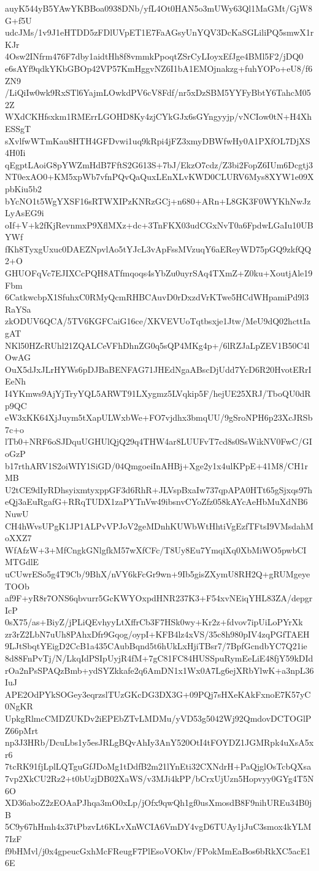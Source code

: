 auyK544yB5YAwYKBBoa0938DNb/yfL4Ot0HAN5o3mUWy63Ql1MaGMt/GjW8G+f5U
udcJMs/1v9J1eHTDD5zFDlUVpET1E7FaAGsyUnYQV3DcKaSGLiliPQ5smwX1rKJr
4Osw2INfrm476F7dby1aidtHh8f8vmmkPpoqtZSrCyLIoyxEfJge4BMl5F2/jDQ0
e6sAYf9qdkYKbGBOp42VP57KmHggvNZ6I1bA1EMOjnakzg+fuhYOPo+eU8/f6ZN9
/LiQiIw0wk9RxSTl6YajmLOwkdPV6cV8Fdf/nr5xDzSBM5YYFyBbtY6TahcM052Z
WXdCKHfsxkm1RMErrLGOHD8Ky4zjCYkGJx6sGYngyyjp/vNCIow0tN+H4XhESSgT
sXvlfwWTmKau8HTH4GFDvwi1uq9kRpi4jFZ3xmyDBWfwHy0A1PXfOL7DjXS4H0Ii
qEgptLAoiG8pYWZmHdB7FftS2G613S+7bJ/EkzO7cdz/Z3bi2FopZ6IUm6Dcgtj3
NT0exAO0+KM5xpWb7vfnPQvQaQuxLEnXLvKWD0CLURV6Mys8XYW1e09XpbKiu5b2
bYcNO1t5WgYXSF16sRTWXIPzKNRzGCj+n680+ARn+L8GK3F0WYKhNwJzLyAsEG9i
oIf+V+k2fKjRevnmxP9XflMXz+dc+3TnFKX03udCGxNvT0a6FpdwLGaIu10UBYWf
fKh8TyxgUxuc0DAEZNpvlAo5tYJcL3vApFssMVzuqY6aEReyWD75pGQ9zkfQQ2+O
GHUOFqVc7EJIXCcPQH8ATfmqoqs4sYbZu0uyrSAq4TXmZ+Z0ku+XoutjAle19Fbm
6CatkwcbpX1SfuhxC0RMyQcmRHBCAuvD0rDxzdVrKTwe5HCdWHpamiPd9l3RaYSa
zkODUV6QCA/5TV6KGFCaiG16ce/XKVEVUoTqtbsxje1Jtw/MeU9dQ02hcttIagAT
NKl50HZcRUhl21ZQALCeVFhDhnZG0q5sQP4MKg4p+/6lRZJaLpZEV1B50C4lOwAG
OuX5dJxJLrHYWs6pDJBaBENFAG71JHEdNgaABscDjUdd7YcD6R20HvotERrIEeNh
I4YKmws9AjYjTryYQL5ARWT91LXygmz5LVqkip5F/hejUE25XRJ/TboQU0dRp9QC
eW3xKK64XjJuym5tXapULWxbWe+FO7vjdhx3bmqUU/9gSroNPH6p23XcJRSb7c+o
lTb0+NRF6oSJDquUGHUlQjQ29q4THW4ar8LUUFvT7cd8s0SsWikNV0FwC/GIoGzP
b17rthARV1S2oiWIY1SiGD/04QmgoeiInAHBj+Xge2y1x4ulKPpE+41M8/CH1rMB
U2tCE9dIyRDhsyixmtyxppGF3d6RhR+JLVspBxaIw737qpAPA0HTt65gSjxqs97h
eQj3aEuRgafG+RRqTUDX1zaPYTnVw49ibsnvCYoZfz058kAYcAeHbMuXdNB6NuwU
CH4hWvsUPgK1JP1ALPvVPJoV2geMDnhKUWbWtHhtiVgEzfTFtsI9VMsdahMoXXZ7
WfAfzW+3+MfCngkGNlgfkM57wXfCFc/T8Uy8Eu7YmqiXq0XbMiWO5pwbCIMTGdlE
uCUwrESo5g4T9Cb/9BhX/nVY6kFcGr9wn+9Ib5gisZXymU8RH2Q+gRUMgeyeTOOb
af9F+yR8r7ONS6qbvurr5GcKWYOxpdHNR237K3+F54xvNEiqYHL83ZA/depgrIcP
0sX75/as+BiyZ/jPLiQEvhyyLtXffrCb3F7HSk0wy+Kr2z+fdvov7ipUiLoPYrXk
zr3rZ2LbN7uUh8PAhxDfr9Gqog/oypI+KFB4lz4xVS/35c8h980pIV4zqPGfTAEH
9LJtSbqtYEigD2CcB1a435CAubBqnd5t6hUkLxHjiTBsr7/7BpfGcndbYC7Q21ie
8d88FnPvTj/N/LkqIdPSIpUyjR4fM+7gC81FC84HUSSpuRymEeLiE48fjY59kDId
rOa2nPsSPAQzBmb+ydSYZkkafe2q6AmDN1x1Wx0A7Lg6ejXRbYlwK+a3npL36IuJ
APE2OdPYkSOGey3eqrzslTUzGKcDG3DX3G+09PQj7sHXeKAkFxnoE7K57yC0NgKR
UpkgRlmcCMDZUKDv2iEPEbZTvLMDMu/yVD53g5042Wj92QmdovDCTOGlPZ66pMrt
np3J3HRb/DcuLbs1y5esJRLgBQvAhIy3AnY520OtI4tFOYDZ1JGMRpk4uXsA5xr6
7tcRK91fjLplLQTguGfJDoMg1tDdfB2m21lYnEti32CXNdrH+PaQjglOsTcbQXsa
7vp2XkCU2Rz2+t0bUzjDB02XaWS/v3MJi4kPP/bCrxUjUzn5Hopvyy0GYg4T5N6O
XD36aboZ2zEOAaPJhqa3mO0xLp/jOfx9qwQh1gf0usXmosdB8F9nihUREu34B0jB
5C9y67hHmh4x37tPbzvLt6KLvXnWCIA6VmDY4vgD6TUAy1jJuC3smox4kYLM7IzF
f9bHMvl/j0x4gpeucGxhMcFReugF7PlEsoVOKbv/FPokMmEaBos6bRkXC5acE16E
